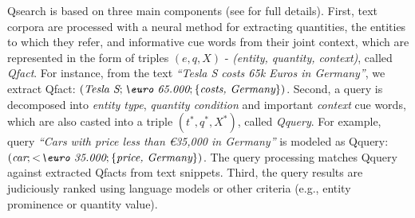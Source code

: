 Qsearch is based on three main components (see \cite{HoISWC2019} for full details).
First, text corpora are processed with a neural method for extracting
quantities, the entities to which they refer, and informative cue words from
their joint context, which are represented in the form of triples $(e,q, X)$ - \textit{(entity, quantity, context)}, called \textit{Qfact}. 
For instance, from the text \textit{``Tesla S costs 65k Euros in Germany''}, we extract Qfact: $(\textit{Tesla S}; \textit{\euro 65.000};\{\textit{costs, Germany}\})$.
Second, a query is decomposed into \textit{entity type}, \textit{quantity condition} and
important \textit{context} cue words, which are also casted into a triple $(t^*,q^*, X^*)$, called \textit{Qquery}. 
For example, query \textit{``Cars with price less than \euro 35,000 in Germany''} is modeled as Qquery: $(\textit{car}; < \hspace{-0.25em} \textit{\euro 35.000}; \{\textit{price, Germany}\})$. The query processing matches Qquery against
extracted Qfacts from text snippets.
Third, the query results are judiciously ranked using language models
or other criteria (e.g., entity prominence or quantity value).

%


